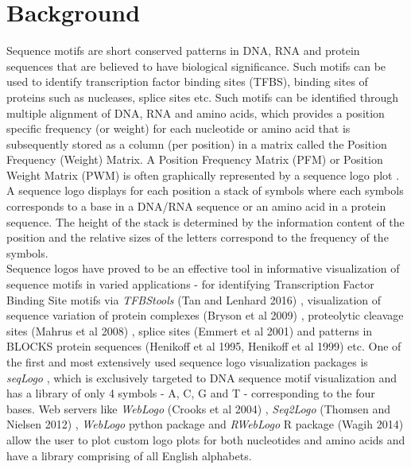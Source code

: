 \documentclass{bmcart}
\begin{document}

\section*{Background}

Sequence motifs are short conserved patterns in DNA, RNA and protein sequences that are believed to have biological significance. Such motifs can be used to identify transcription factor binding sites (TFBS), binding sites of proteins such as nucleases, splice sites etc. Such motifs can be identified through multiple alignment of DNA, RNA and amino acids, which provides a position specific frequency (or weight) for each nucleotide or amino acid that is subsequently stored as a column (per position) in a matrix called the Position Frequency (Weight) Matrix. A Position Frequency Matrix (PFM) or Position Weight Matrix (PWM) is often graphically represented by a sequence logo plot \cite{Schneider1990}. A sequence logo displays for each position a stack of  symbols where each symbols corresponds to a base in a DNA/RNA sequence or an amino acid in a protein sequence. The height of the stack is determined by the information content of the position and the relative sizes of the letters correspond to the frequency of the symbols. \\[3 pt]

Sequence logos have proved to be an effective tool in informative visualization of sequence motifs in varied applications - for identifying Transcription Factor Binding Site motifs via \textit{TFBStools} (Tan and Lenhard 2016) \cite{Tan2016}, visualization of sequence variation of protein complexes (Bryson et al 2009) \cite{Bryson2009}, proteolytic cleavage sites (Mahrus et al 2008) \cite{Mahrus2008}, splice sites (Emmert et al 2001)\cite{Emmert2001} and patterns in BLOCKS protein sequences (Henikoff et al 1995, Henikoff et al 1999) \cite{Henikoff1995,Henikoff1999} etc. One of the first and most extensively used  sequence logo visualization packages is \textit{seqLogo} \cite{Bembom2017}, which is exclusively targeted to DNA sequence motif visualization and has a library of only 4 symbols - A, C, G and T - corresponding to the four bases. Web servers like  \textit{WebLogo} (Crooks et al 2004) \cite{Crooks2004}, \textit{Seq2Logo} (Thomsen and Nielsen 2012) \cite{Thomsen2012}, \textit{WebLogo} python package  and \textit{RWebLogo} R package (Wagih 2014) \cite{Wagih2014} allow the user to plot custom logo plots for both nucleotides and amino acids and have a library comprising of all English alphabets. \\[3 pt]
\end{document}
